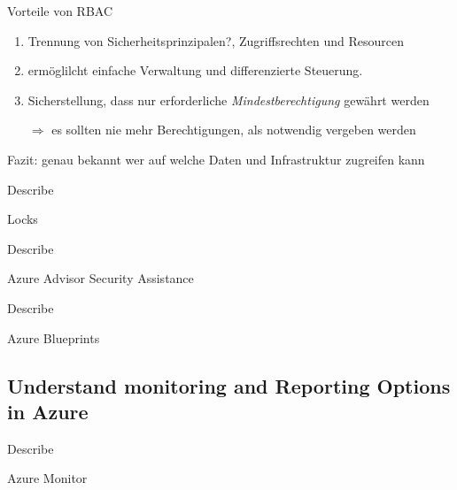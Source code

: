 \documentclass{scrartcl}
\newenvironment{flashcard}[2][]{%
    #1
    \vfill
    \centerline{\Large{#2}}
    \vfill
\newpage
}
{\newpage}
\newcommand{\subsectioncard}[1]{
    \vspace*{\stretch{1}}
    \subsection{#1}
    \vspace*{\stretch{1}}
    \pagebreak
}
\begin{document}
    \begin{flashcard}[]{Vorteile von RBAC}
        \begin{enumerate}
            \item Trennung von Sicherheitsprinzipalen?, Zugriffsrechten und Resourcen
            \item ermöglilcht einfache Verwaltung und differenzierte Steuerung.
            \item Sicherstellung, dass nur erforderliche \emph{Mindestberechtigung} gewährt werden
            \item[$\Rightarrow$] es sollten nie mehr Berechtigungen, als notwendig vergeben werden
        \end{enumerate}
        Fazit: genau bekannt wer auf welche Daten und Infrastruktur zugreifen kann
    \end{flashcard}

    \begin{flashcard}[Describe]{Locks}

    \end{flashcard}

    \begin{flashcard}[Describe]{Azure Advisor Security Assistance}

    \end{flashcard}

    \begin{flashcard}[Describe]{Azure Blueprints}

    \end{flashcard}

    \subsectioncard{Understand monitoring and Reporting Options in Azure}

    \begin{flashcard}[Describe]{Azure Monitor}

    \end{flashcard}
\end{document}
